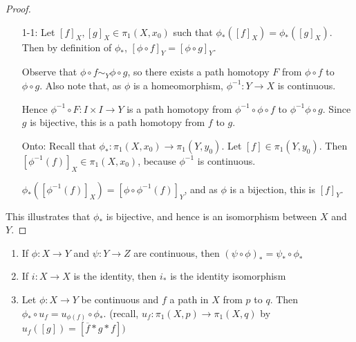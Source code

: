 \begin{proof}

\begin{itemize}
\item[1-1:]  Let $[f]_X, [g]_X\in \pi_1(X,x_0)$ such that $\phi_* ([f]_X)=\phi_*([g]_X)$.  Then by definition of $\phi_*$, $[\phi\circ f]_Y=[\phi\circ g]_Y$.  

Observe that $\phi\circ f\sim_Y \phi\circ g$, so there exists a path homotopy $F$ from $\phi\circ f$ to $\phi\circ g$.  Also note that, as $\phi$ is a homeomorphism, $\phi^{-1}:Y\to X$ is continuous.

Hence $\phi^{-1}\circ F:I\times I \to Y$ is a path homotopy from $\phi^{-1}\circ \phi\circ f$ to $\phi^{-1}\phi\circ g.$ Since $g$ is bijective, this is a path homotopy from $f$ to $g$.

\item[Onto:] Recall that $\phi_*:\pi_1(X,x_0)\to \pi_1(Y,y_0)$.  Let $[f]\in \pi_1(Y,y_0)$.  Then $[\phi^{-1}(f)]_X\in \pi_1(X,x_0)$, because $\phi^{-1}$ is continuous.

$\phi_*([\phi^{-1}(f)]_X)=[\phi\circ \phi^{-1}(f)]_Y$, and as $\phi$ is a bijection, this is $[f]_Y$.  
\end{itemize}

This illustrates that $\phi_*$ is bijective, and hence is an isomorphism between $X$ and $Y$.  
\end{proof}

\begin{smallfact}
\begin{enumerate}
	\item If $\phi: X\to Y$ and $\psi: Y\to Z$ are continuous, then $(\psi \circ \phi)_* = \psi_* \circ \phi_*$
	\item If $i:X\to X$ is the identity, then $i_*$ is the identity isomorphism
	\item Let $\phi:X\to Y$ be continuous and $f$ a path in $X$ from $p$ to $q$. Then $\phi_\ast \circ u_f = u_{\phi(f)}\circ \phi_*$. (recall, $u_f:\pi_1 (X,p) \to \pi_1(X,q)$ by $u_f([g]) = [\overline{f} \ast g \ast f ] )$
\end{enumerate}
\end{smallfact}

